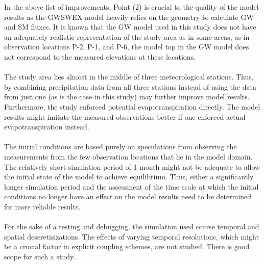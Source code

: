 In the above list of improvements, Point (2) is crucial to the quality of the model results as the GWSWEX model heavily relies on the geometry to calculate GW and SM fluxes. It is known that the GW model used in this study does not have an adequately realistic representation of the study area as in some areas, as in observation locations P-2, P-1, and P-6, the model top in the GW model does not correspond to the measured elevations at these locations.
\\ \\
The study area lies almost in the middle of three meteorological stations. Thus, by combining  precipitation data from all three stations instead of using the data from just one (as is the case in this study) may further improve model results.
\\
Furthermore, the study enforced potential evapotranspiration directly. The model results might imitate the measured observations better if one enforced actual evapotranspiration instead.
\\ \\
The initial conditions are based purely on speculations from observing the measurements from the few observation locations that lie in the model domain. The relatively short simulation period of 1 month might not be adequate to allow the initial state of the model to achieve equilibrium. Thus, either a significantly longer simulation period and the assessment of the time scale at which the initial conditions no longer have an effect on the model results need to be determined for more reliable results.
\\ \\
For the sake of a testing and debugging, the simulation used coarse temporal and spatial descretisizations. The effects of varying temporal resolutions, which might be a crucial factor in explicit coupling schemes, are not studied. There is good scope for such a study.

\endinput